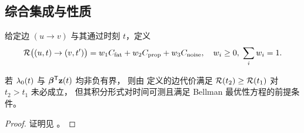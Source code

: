 \subsection{综合集成与性质}

\begin{definition}[综合风险代价]
给定边 $(u \to v)$ 与其通过时刻 $t$，定义
\begin{equation}
  \mathcal{R}\bigl((u, t) \to (v, t')\bigr)
    = w_1 C_{\mathrm{fat}} + w_2 C_{\mathrm{prop}} + w_3 C_{\mathrm{noise}},
  \quad w_i \ge 0,\; \sum_i w_i = 1.
  \label{eq:risk-cost}
\end{equation}
\end{definition}

\begin{theorem}[单调性]
\label{thm:monotone}
若 $\lambda_0(t)$ 与 $\boldsymbol{\beta}^{\mathsf{T}} \mathbf{z}(t)$ 均非负有界，
则由  定义的边代价满足
$\mathcal{R}(t_2) \ge \mathcal{R}(t_1)$ 对 $t_2 > t_1$ 未必成立，
但其积分形式对时间可测且满足 Bellman 最优性方程的前提条件。
\end{theorem}

\begin{proof}
证明见 。
\end{proof}
